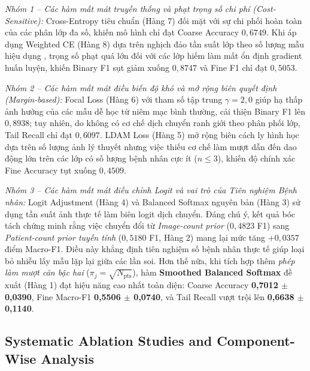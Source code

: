 \documentclass[runningheads]{llncs}
\begin{document}
\textit{Nhóm 1 -- Các hàm mất mát truyền thống và phạt trọng số chi phí (Cost-Sensitive):} Cross-Entropy tiêu chuẩn (Hàng 7) đối mặt với sự chi phối hoàn toàn của các phân lớp đa số, khiến mô hình chỉ đạt Coarse Accuracy $0{,}6749$. Khi áp dụng Weighted CE (Hàng 8) dựa trên nghịch đảo tần suất lớp theo số lượng mẫu hiệu dụng \cite{ref_cui2019class}, trọng số phạt quá lớn đối với các lớp hiếm làm mất ổn định gradient huấn luyện, khiến Binary F1 sụt giảm xuống $0{,}8747$ và Fine F1 chỉ đạt $0{,}5053$.

\textit{Nhóm 2 -- Các hàm mất mát điều biến độ khó và mở rộng biên quyết định (Margin-based):} Focal Loss \cite{ref_lin2017focal} (Hàng 6) với tham số tập trung $\gamma=2{,}0$ giúp hạ thấp ảnh hưởng của các mẫu dễ học từ niêm mạc bình thường, cải thiện Binary F1 lên $0{,}8938$; tuy nhiên, do không có cơ chế dịch chuyển ranh giới theo phân phối lớp, Tail Recall chỉ đạt $0{,}6097$. LDAM Loss \cite{ref_cao2019ldam} (Hàng 5) mở rộng biên cách ly hình học dựa trên số lượng ảnh lý thuyết nhưng việc thiếu cơ chế làm mượt dẫn đến dao động lớn trên các lớp có số lượng bệnh nhân cực ít ($n \le 3$), khiến độ chính xác Fine Accuracy tụt xuống $0{,}4509$.

\textit{Nhóm 3 -- Các hàm mất mát điều chỉnh Logit và vai trò của Tiên nghiệm Bệnh nhân:} Logit Adjustment \cite{ref_menon2021logit} (Hàng 4) và Balanced Softmax nguyên bản \cite{ref_ren2020balanced} (Hàng 3) sử dụng tần suất ảnh thực tế làm biên logit dịch chuyển. Đáng chú ý, kết quả bóc tách chứng minh rằng việc chuyển đổi từ \textit{Image-count prior} ($0{,}4823$ F1) sang \textit{Patient-count prior tuyến tính} ($0{,}5180$ F1, Hàng 2) mang lại mức tăng $+0{,}0357$ điểm Macro-F1. Điều này khẳng định tiên nghiệm số bệnh nhân thực tế giúp loại bỏ nhiễu lấy mẫu lặp lại giữa các lần soi. Hơn thế nữa, khi tích hợp thêm \textit{phép làm mượt căn bậc hai} ($\pi_j = \sqrt{N_{\text{pts}}}$), hàm \textbf{Smoothed Balanced Softmax} đề xuất (Hàng 1) đạt hiệu năng cao nhất toàn diện: Coarse Accuracy \textbf{0,7012 $\pm$ 0,0390}, Fine Macro-F1 \textbf{0,5506 $\pm$ 0,0740}, và Tail Recall vượt trội lên \textbf{0,6638 $\pm$ 0,1140}.

\subsection{Systematic Ablation Studies and Component-Wise Analysis}
\label{sec:ablations}
\end{document}
